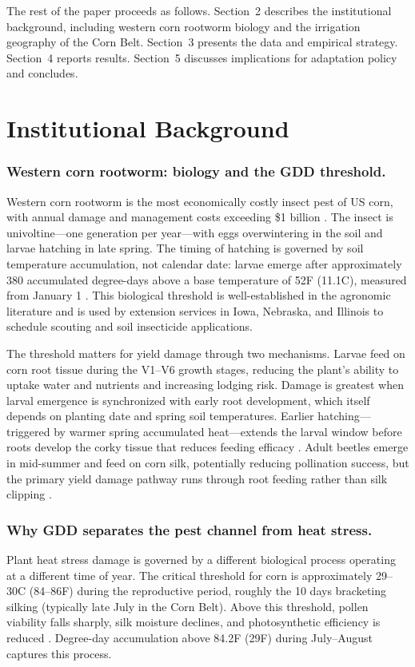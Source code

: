 \documentclass[12pt]{article}
\begin{document}
The rest of the paper proceeds as follows. Section~2 describes the institutional background, including western corn rootworm biology and the irrigation geography of the Corn Belt. Section~3 presents the data and empirical strategy. Section~4 reports results. Section~5 discusses implications for adaptation policy and concludes.


\section{Institutional Background}

\subsubsection*{Western corn rootworm: biology and the GDD threshold.}
Western corn rootworm is the most economically costly insect pest of US corn, with annual damage and management costs exceeding \$1 billion \citep{gray2009western, metcalf1986economic}. The insect is univoltine---one generation per year---with eggs overwintering in the soil and larvae hatching in late spring. The timing of hatching is governed by soil temperature accumulation, not calendar date: larvae emerge after approximately 380 accumulated degree-days above a base temperature of 52\textdegree{}F (11.1\textdegree{}C), measured from January 1 \citep{jarvis1994phenology}. This biological threshold is well-established in the agronomic literature and is used by extension services in Iowa, Nebraska, and Illinois to schedule scouting and soil insecticide applications.

The threshold matters for yield damage through two mechanisms. Larvae feed on corn root tissue during the V1--V6 growth stages, reducing the plant's ability to uptake water and nutrients and increasing lodging risk. Damage is greatest when larval emergence is synchronized with early root development, which itself depends on planting date and spring soil temperatures. Earlier hatching---triggered by warmer spring accumulated heat---extends the larval window before roots develop the corky tissue that reduces feeding efficacy \citep{gray2009western}. Adult beetles emerge in mid-summer and feed on corn silk, potentially reducing pollination success, but the primary yield damage pathway runs through root feeding rather than silk clipping \citep{levine2002western}.

\subsubsection*{Why GDD separates the pest channel from heat stress.}
Plant heat stress damage is governed by a different biological process operating at a different time of year. The critical threshold for corn is approximately 29--30\textdegree{}C (84--86\textdegree{}F) during the reproductive period, roughly the 10 days bracketing silking (typically late July in the Corn Belt). Above this threshold, pollen viability falls sharply, silk moisture declines, and photosynthetic efficiency is reduced \citep{schlenker2009nonlinear, lobell2011climate}. Degree-day accumulation above 84.2\textdegree{}F (29\textdegree{}F) during July--August captures this process.
\end{document}
